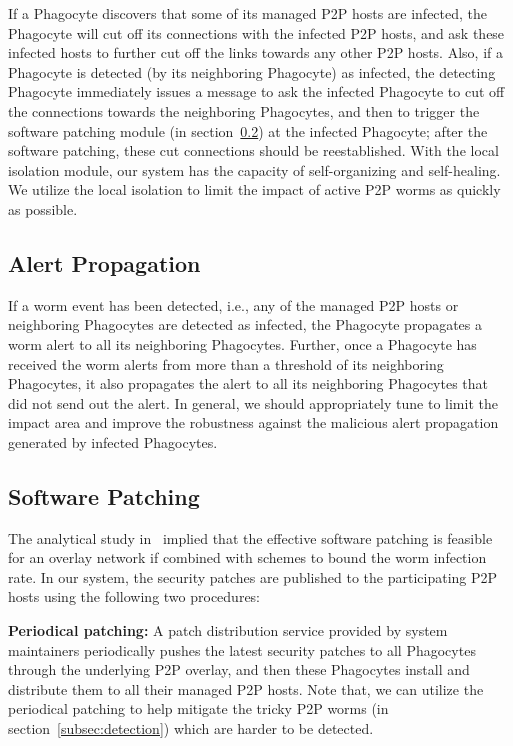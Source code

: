 \documentclass[times,10pt,twocolumn]{article}
\begin{document}
If a Phagocyte discovers that some of its managed P2P hosts are
infected, the Phagocyte will cut off its connections with the
infected P2P hosts, and ask these infected hosts to further cut off
the links towards any other P2P hosts. Also, if a Phagocyte is
detected (by its neighboring Phagocyte) as infected, the detecting
Phagocyte immediately issues a message to ask the infected Phagocyte
to cut off the connections towards the neighboring Phagocytes, and
then to trigger the software patching module (in
section~\ref{subsec:patching}) at the infected Phagocyte; after the
software patching, these cut connections should be reestablished.
With the local isolation module, our system has the capacity of
self-organizing and self-healing. We utilize the local isolation to
limit the impact of active P2P worms as quickly as possible.








\subsection{Alert Propagation}

If a worm event has been detected, i.e., any of the managed P2P
hosts or neighboring Phagocytes are detected as infected, the
Phagocyte propagates a worm alert to all its neighboring Phagocytes.
Further, once a Phagocyte has received the worm alerts from more
than a threshold  of its neighboring Phagocytes, it also
propagates the alert to all its neighboring Phagocytes that did not
send out the alert. In general, we should appropriately tune
 to limit the impact area and improve the robustness
against the malicious alert propagation generated by infected
Phagocytes.






\subsection{Software Patching}
\label{subsec:patching}

The analytical study in~\cite{1103634} implied that the effective
software patching is feasible for an overlay network if combined
with schemes to bound the worm infection rate. In our system, the
security patches are published to the participating P2P hosts using
the following two procedures:



\textbf{Periodical patching:} A patch distribution service provided
by system maintainers periodically pushes the latest security
patches to all Phagocytes through the underlying P2P overlay, and
then these Phagocytes install and distribute them to all their
managed P2P hosts. Note that, we can utilize the periodical patching
to help mitigate the tricky P2P worms (in
section~\ref{subsec:detection}) which are harder to be detected.
\end{document}
